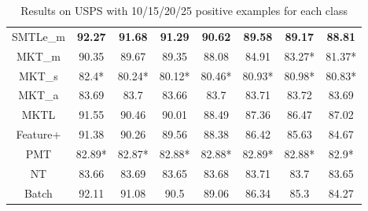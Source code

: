 \begin{table*}
{{\begin{tabular}{|c|c|c|c|c|c|c|c|}
      SMTLe\_m & \textbf{92.27} & \textbf{91.68} & \textbf{91.29} & \textbf{90.62} & \textbf{89.58} & \textbf{89.17} & \textbf{88.81}\\ 
      MKT\_{m} & 90.35 & 89.67 & 89.35 & 88.08 & 84.91 & 83.27* & 81.37*\\ 
      MKT\_{s} & 82.4* & 80.24* & 80.12* & 80.46* & 80.93* & 80.98* & 80.83*\\ 
      MKT\_{a} & 83.69 & 83.7 & 83.66 & 83.7 & 83.71 & 83.72 & 83.69\\ 
      MKTL & 91.55 & 90.46 & 90.01 & 88.49 & 87.36 & 86.47 & 87.02\\ 
      Feature+ & 91.38 & 90.26 & 89.56 & 88.38 & 86.42 & 85.63 & 84.67\\ 
      PMT & 82.89* & 82.87* & 82.88* & 82.88* & 82.89* & 82.88* & 82.9*\\ 
      NT & 83.66 & 83.69 & 83.65 & 83.68 & 83.71 & 83.7 & 83.65\\ 
      Batch & 92.11 & 91.08 & 90.5 & 89.06 & 86.34 & 85.3 & 84.27\\ 
\hline\end{tabular}}}\caption{Results on USPS with 10/15/20/25 positive examples for each class} \label{tab:usps}
\end{table*}